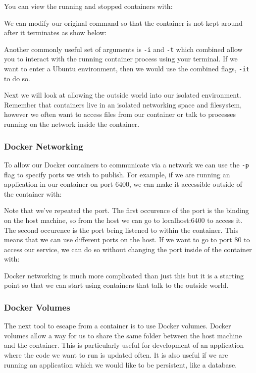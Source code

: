\documentclass{csse4400}
\begin{document}
You can view the running and stopped containers with:

We can modify our original command so that the container is not kept around after it terminates as show below:

Another commonly useful set of arguments is \texttt{-i} and \texttt{-t} which combined allow you to interact with the running container process using your terminal.
If we want to enter a Ubuntu environment,
then we would use the combined flags, \texttt{-it} to do so.

Next we will look at allowing the outside world into our isolated environment.
Remember that containers live in an isolated networking space and filesystem,
however we often want to access files from our container or talk to processes running on the network inside the container.

\subsubsection{Docker Networking}

To allow our Docker containers to communicate via a network we can use the \texttt{-p} flag to specify ports we wish to publish.
For example, if we are running an application in our container on port 6400,
we can make it accessible outside of the container with:

Note that we've repeated the port.
The first occurence of the port is the binding on the host machine,
so from the host we can go to localhost:6400 to access it.
The second occurence is the port being listened to within the container.
This means that we can use different ports on the host.
If we want to go to port 80 to access our service,
we can do so without changing the port inside of the container with:

Docker networking is much more complicated than just this but it is a starting point so that we can start using containers that talk to the outside world.


\subsubsection{Docker Volumes}

The next tool to escape from a container is to use Docker volumes.
Docker volumes allow a way for us to share the same folder between the host machine and the container.
This is particularly useful for development of an application where the code we want to run is updated often.
It is also useful if we are running an application which we would like to be persistent, like a database.
\end{document}
